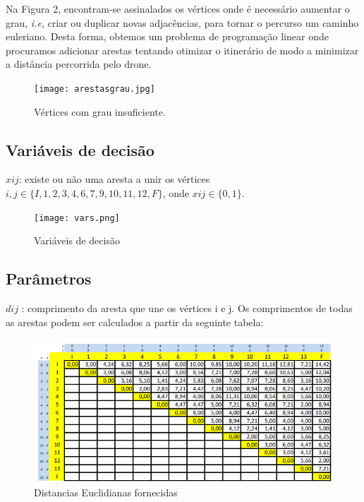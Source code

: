 \documentclass[runningheads]{llncs}
\begin{document}
    Na Figura 2, encontram-se assinalados os vértices onde é necessário aumentar o grau, \textit{i.e}, criar ou duplicar novas adjacências, para tornar o percurso um caminho euleriano. Desta forma, obtemos um problema de programação linear onde procuramos adicionar arestas tentando otimizar o itinerário de modo a minimizar a distância percorrida pelo drone.

    \begin{figure}[h]
        \centering
        \texttt{[image: arestasgrau.jpg]}
        \caption{Vértices com grau insuficiente.}
        \label{fig:data2}
    \end{figure}

    \subsection{Variáveis de decisão}

    $xij$: existe ou não uma aresta a unir os vértices $i,j \in \{I,1,2,3,4,6,7,9,10,11,12,F\}$, onde $xij \in \{0,1\}$.

    \begin{figure}[h]
        \centering
        \texttt{[image: vars.png]}
        \caption{Variáveis de decisão}
        \label{fig:data3}
    \end{figure}

    \newpage

    \subsection{Parâmetros}

    $dij$ : comprimento da aresta que une os vértices i e j.
    Os comprimentos de todas as arestas podem ser calculados a partir da seguinte tabela:

    \begin{figure}[h]
        \centering
        \includegraphics[scale=0.75]{distancias euclidianas.PNG}
        \caption{Distancias Euclidianas fornecidas}
        \label{fig:data4}
    \end{figure}
\end{document}
